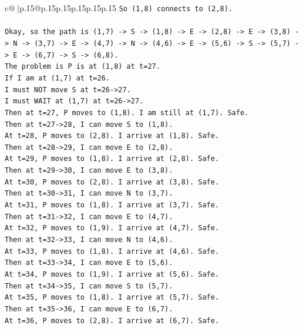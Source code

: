 \documentclass{article}
\begin{document}
{\begin{supertabular}{c@{$\;$}|p{.15\linewidth}@{}p{.15\linewidth}p{.15\linewidth}p{.15\linewidth}p{.15\linewidth}p{.15\linewidth}}
{{{\texttt{So (1,8) connects to (2,8).} \\
\\ 
\texttt{Okay, so the path is (1,7) {-}> S {-}> (1,8) {-}> E {-}> (2,8) {-}> E {-}> (3,8) {-}> N {-}> (3,7) {-}> E {-}> (4,7) {-}> N {-}> (4,6) {-}> E {-}> (5,6) {-}> S {-}> (5,7) {-}> E {-}> (6,7) {-}> S {-}> (6,8).} \\
\texttt{The problem is P is at (1,8) at t=27.} \\
\texttt{If I am at (1,7) at t=26.} \\
\texttt{I must NOT move S at t=26{-}>27.} \\
\texttt{I must WAIT at (1,7) at t=26{-}>27.} \\
\texttt{Then at t=27, P moves to (1,8). I am still at (1,7). Safe.} \\
\texttt{Then at t=27{-}>28, I can move S to (1,8).} \\
\texttt{At t=28, P moves to (2,8). I arrive at (1,8). Safe.} \\
\texttt{Then at t=28{-}>29, I can move E to (2,8).} \\
\texttt{At t=29, P moves to (1,8). I arrive at (2,8). Safe.} \\
\texttt{Then at t=29{-}>30, I can move E to (3,8).} \\
\texttt{At t=30, P moves to (2,8). I arrive at (3,8). Safe.} \\
\texttt{Then at t=30{-}>31, I can move N to (3,7).} \\
\texttt{At t=31, P moves to (1,8). I arrive at (3,7). Safe.} \\
\texttt{Then at t=31{-}>32, I can move E to (4,7).} \\
\texttt{At t=32, P moves to (1,9). I arrive at (4,7). Safe.} \\
\texttt{Then at t=32{-}>33, I can move N to (4,6).} \\
\texttt{At t=33, P moves to (1,8). I arrive at (4,6). Safe.} \\
\texttt{Then at t=33{-}>34, I can move E to (5,6).} \\
\texttt{At t=34, P moves to (1,9). I arrive at (5,6). Safe.} \\
\texttt{Then at t=34{-}>35, I can move S to (5,7).} \\
\texttt{At t=35, P moves to (1,8). I arrive at (5,7). Safe.} \\
\texttt{Then at t=35{-}>36, I can move E to (6,7).} \\
\texttt{At t=36, P moves to (2,8). I arrive at (6,7). Safe.} \\
}}}
\end{supertabular}}
\end{document}
